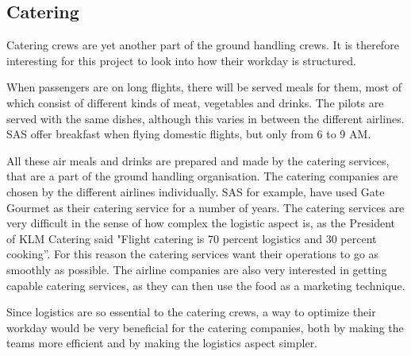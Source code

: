 \subsection{Catering} 
Catering crews are yet another part of the ground handling crews. It is therefore interesting for this project to look into how their workday is structured.

When passengers are on long flights, there will be served meals for them, most of which consist of different kinds of meat, vegetables and drinks. The pilots are served with the same dishes, although this varies in between the different airlines\cite{cate_pilotfood1}\cite{cate_pilotfood2}. SAS offer breakfast when flying domestic flights, but only from 6 to 9 AM\cite{cate_SASIndri}.

All these air meals and drinks are prepared and made by the catering services, that are a part of the ground handling organisation. The catering companies are chosen by the different airlines individually. SAS for example, have used Gate Gourmet\cite{cate_SASGourmet} as their catering service for a number of years. The catering services are very difficult in the sense of how complex the logistic aspect is, as the President of KLM Catering said "Flight catering is 70 percent logistics and 30 percent cooking”\cite{cate_BookSection}. For this reason the catering services want their operations to go as smoothly as possible. The airline companies are also very interested in getting capable catering services, as they can then use the food as a marketing technique\cite{cate_BookSection}. 

Since logistics are so essential to the catering crews, a way to optimize their workday would be very beneficial for the catering companies, both by making the teams more efficient and by making the logistics aspect simpler.